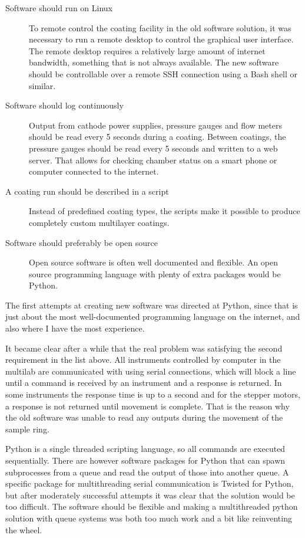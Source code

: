 \begin{description}
  \item[Software should run on Linux] To remote control the coating facility in the old software solution, it was necessary to run a remote desktop to control the graphical user interface. The remote desktop requires a relatively large amount of internet bandwidth, something that is not always available. The new software should be controllable over a remote SSH connection using a Bash shell or similar.
  \item[Software should log continuously] Output from cathode power supplies, pressure gauges and flow meters should be read every 5 seconds during a coating. Between coatings, the pressure gauges should be read every 5 seconds and written to a web server. That allows for checking chamber status on a smart phone or computer connected to the internet.
  \item[A coating run should be described in a script] Instead of predefined coating types, the scripts make it possible to produce completely custom multilayer coatings.
  \item[Software should preferably be open source] Open source software is often well documented and flexible. An open source programming language with plenty of extra packages would be Python.
\end{description}

The first attempts at creating new software was directed at Python, since that is just about the most well-documented programming language on the internet, and also where I have the most experience.

It became clear after a while that the real problem was satisfying the second requirement in the list above. All instruments controlled by computer in the multilab are communicated with using serial connections, which will block a line until a command is received by an instrument and a response is returned. In some instruments the response time is up to a second and for the stepper motors, a response is not returned until movement is complete. That is the reason why the old software was unable to read any outputs during the movement of the sample ring.

Python is a single threaded scripting language, so all commands are executed sequentially. There are however software packages for Python that can spawn subprocesses from a queue and read the output of those into another queue. A specific package for multithreading serial communication is Twisted for Python, but after moderately successful attempts it was clear that the solution would be too difficult. The software should be flexible and making a multithreaded python solution with queue systems was both too much work and a bit like reinventing the wheel.

